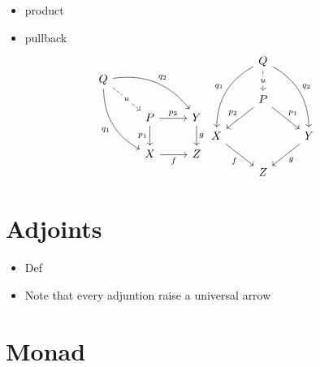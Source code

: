 \begin{itemize}
\item product \label{prod-univ}
\item pullback
  $$
\begin{tikzcd}
Q
\arrow[bend left]{drr}{q_2}
\arrow[bend right,swap]{ddr}{q_1}
\arrow[dashed]{dr}[description]{u} & & \\
& P \arrow{r}{p_2} \arrow{d}[swap]{p_1}
& Y \arrow{d}{g} \\
& X \arrow[swap]{r}{f}
& Z
\end{tikzcd}

\begin{tikzcd}
{} & Q
\arrow[bend right,swap]{ddl}{q_1}
\arrow[bend left]{ddr}{q_2}
\arrow[dashed]{d}[description]{u} & & \\
& P \arrow{dr}{p_1} \arrow{dl}[swap]{p_2} \\
X \arrow[swap]{dr}{f} & & 
Y \arrow{dl}{g} \\
& Z
\end{tikzcd}
  $$
\end{itemize}
\section{Adjoints}


\begin{itemize}
\item Def
\item Note that every adjuntion raise a universal arrow
\end{itemize}

\section{Monad}
